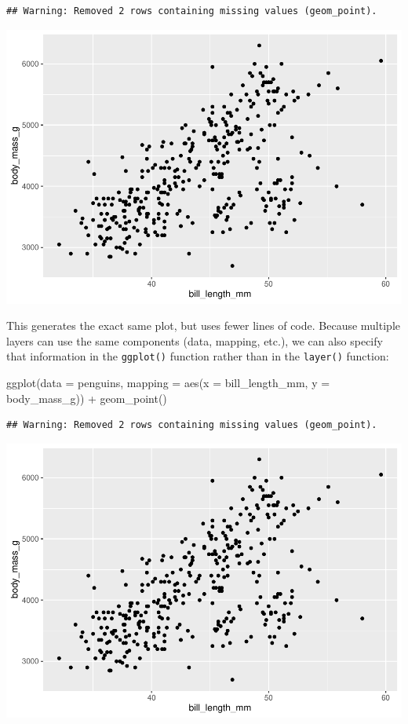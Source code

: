 \documentclass[
]{article}
\newenvironment{Shaded}{\begin{snugshade}}{\end{snugshade}}
\newcommand{\AttributeTok}[1]{\textcolor[rgb]{0.77,0.63,0.00}{#1}}
\newcommand{\FunctionTok}[1]{\textcolor[rgb]{0.00,0.00,0.00}{#1}}
\newcommand{\NormalTok}[1]{#1}
\newcommand{\SpecialCharTok}[1]{\textcolor[rgb]{0.00,0.00,0.00}{#1}}
\begin{document}
\begin{verbatim}
## Warning: Removed 2 rows containing missing values (geom_point).
\end{verbatim}

\includegraphics{Grammar-of-Graphics_files/figure-latex/default2-1.pdf}

This generates the exact same plot, but uses fewer lines of code.
Because multiple layers can use the same components (data, mapping,
etc.), we can also specify that information in the \texttt{ggplot()}
function rather than in the \texttt{layer()} function:

\begin{Shaded}
\begin{Highlighting}[]
\FunctionTok{ggplot}\NormalTok{(}\AttributeTok{data =}\NormalTok{ penguins, }\AttributeTok{mapping =} \FunctionTok{aes}\NormalTok{(}\AttributeTok{x =}\NormalTok{ bill\_length\_mm, }\AttributeTok{y =}\NormalTok{ body\_mass\_g)) }\SpecialCharTok{+}
  \FunctionTok{geom\_point}\NormalTok{()}
\end{Highlighting}
\end{Shaded}

\begin{verbatim}
## Warning: Removed 2 rows containing missing values (geom_point).
\end{verbatim}

\includegraphics{Grammar-of-Graphics_files/figure-latex/default3-1.pdf}
\end{document}
